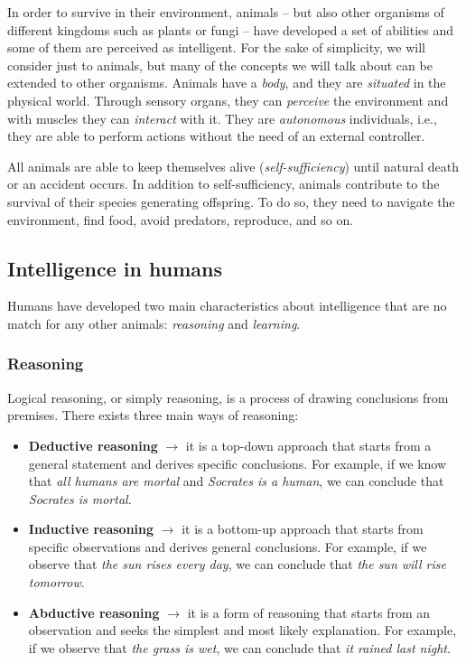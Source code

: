 In order to survive in their environment, animals -- but also other organisms of different kingdoms such as plants or fungi -- have developed a set of abilities and some of them are perceived as intelligent.
%
For the sake of simplicity, we will consider just to animals, but many of the concepts we will talk about can be extended to other organisms.
%
Animals have a \emph{body}, and they are \emph{situated} in the physical world.
%
Through sensory organs, they can \emph{perceive} the environment and with muscles they can \emph{interact} with it.
%
They are \emph{autonomous} individuals, i.e., they are able to perform actions without the need of an external controller.


All animals are able to keep themselves alive (\emph{self-sufficiency}) until natural death or an accident occurs.
%
In addition to self-sufficiency, animals contribute to the survival of their species generating offspring.
%
To do so, they need to navigate the environment, find food, avoid predators, reproduce, and so on.
%


\subsection{Intelligence in humans}\label{subsec:intelligence-in-humans}

Humans have developed two main characteristics about intelligence that are no match for any other animals: \emph{reasoning} and \emph{learning}.

\subsubsection{Reasoning}\label{subsubsec:reasoning}
%
Logical reasoning, or simply reasoning, is a process of drawing conclusions from premises.
%
There exists three main ways of reasoning:
%
\begin{itemize}
    \item \textbf{Deductive reasoning} $\rightarrow$ it is a top-down approach that starts from a general statement and derives specific conclusions.
    For example, if we know that \emph{all humans are mortal} and \emph{Socrates is a human}, we can conclude that \emph{Socrates is mortal}.
    \item \textbf{Inductive reasoning} $\rightarrow$ it is a bottom-up approach that starts from specific observations and derives general conclusions.
    For example, if we observe that \emph{the sun rises every day}, we can conclude that \emph{the sun will rise tomorrow}.
    \item \textbf{Abductive reasoning} $\rightarrow$ it is a form of reasoning that starts from an observation and seeks the simplest and most likely explanation.
    For example, if we observe that \emph{the grass is wet}, we can conclude that \emph{it rained last night}.
\end{itemize}

